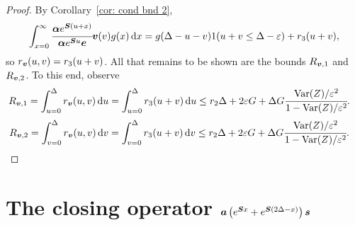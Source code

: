 \begin{proof}
	By Corollary~\ref{cor: cond bnd 2}, 
	\[\int_{x=0}^\infty \cfrac{\boldsymbol \alpha  e^{\boldsymbol{S} (u+x)} }{\boldsymbol \alpha  e^{\boldsymbol{S} u} \boldsymbol e} {\boldsymbol v}(v)g(x)\, \mathrm{d} x = g(\Delta-u-v) 1(u+v\leq\Delta-\varepsilon) + r_3 (u+v),\]
	so \(r_{\boldsymbol v}(u,v)=r_3(u+v)\). All that remains to be shown are the bounds \(R_{{\boldsymbol v},1}\) and \(R_{{\boldsymbol v},2}\). To this end, observe 
	\begin{align*}
		R_{{\boldsymbol v},1}= \displaystyle\int_{u=0}^{\Delta}r_{\boldsymbol v}(u,v)\, \mathrm{d} u 
		 &= \displaystyle\int_{u=0}^{\Delta} r_3(u+v)\, \mathrm{d} u 
		 \leq r_2\Delta + 2\varepsilon G + \Delta G \cfrac{\mathrm{Var}(Z)/\varepsilon^2}{1-\mathrm{Var}(Z)/\varepsilon^2}.
	\end{align*}
	\begin{align*}
		 R_{{\boldsymbol v},2}= \displaystyle\int_{v=0}^{\Delta}r_{\boldsymbol v}(u,v)\, \mathrm{d} v 
		 &= \displaystyle\int_{v=0}^{\Delta} r_3(u+v)\, \mathrm{d} v 
		 \leq r_2\Delta + 2\varepsilon G + \Delta G \cfrac{\mathrm{Var}(Z)/\varepsilon^2}{1-\mathrm{Var}(Z)/\varepsilon^2}.
	\end{align*}
\end{proof}


\section{The closing operator \(\boldsymbol a  \left(e^{\boldsymbol{S} x}  + e^{\boldsymbol{S} (2\Delta-x)}  \right)\boldsymbol s\)}

